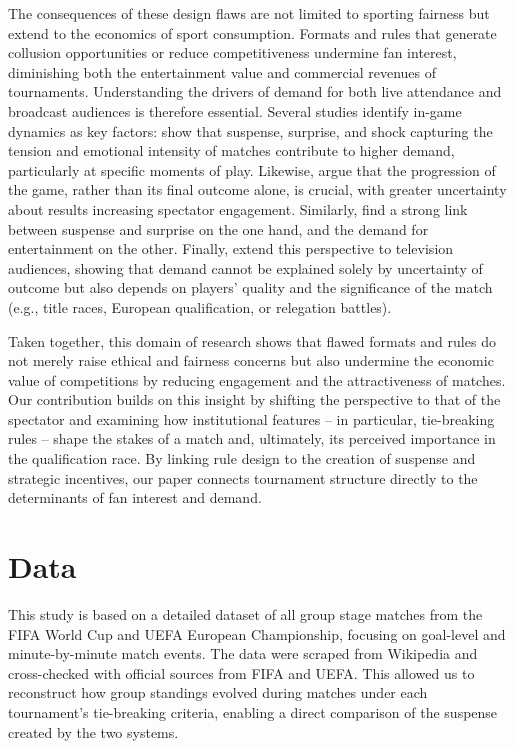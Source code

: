 \documentclass[11pt]{article}
\begin{document}
The consequences of these design flaws are not limited to sporting fairness but extend to the economics of sport consumption. Formats and rules that generate collusion opportunities or reduce competitiveness undermine fan interest, diminishing both the entertainment value and commercial revenues of tournaments. Understanding the drivers of demand for both live attendance and broadcast audiences is therefore essential. Several studies identify in-game dynamics as key factors: \citet{buraimo2020unscripted} show that suspense, surprise, and shock capturing the tension and emotional intensity of matches contribute to higher demand, particularly at specific moments of play. Likewise, \citet{alavy2010edge} argue that the progression of the game, rather than its final outcome alone, is crucial, with greater uncertainty about results increasing spectator engagement. Similarly, \citet{bizzozero2016importance} find a strong link between suspense and surprise on the one hand, and the demand for entertainment on the other. Finally, \citet{buraimo2022armchair} extend this perspective to television audiences, showing that demand cannot be explained solely by uncertainty of outcome but also depends on players' quality and the significance of the match (e.g., title races, European qualification, or relegation battles).

Taken together, this domain of research shows that flawed formats and rules do not merely raise ethical and fairness concerns but also undermine the economic value of competitions by reducing engagement and the attractiveness of matches. Our contribution builds on this insight by shifting the perspective to that of the spectator and examining how institutional features -- in particular, tie-breaking rules -- shape the stakes of a match and, ultimately, its perceived importance in the qualification race. By linking rule design to the creation of suspense and strategic incentives, our paper connects tournament structure directly to the determinants of fan interest and demand.


\section{Data}
\label{sec:data}


This study is based on a detailed dataset of all group stage matches from the FIFA World Cup and UEFA European Championship, focusing on goal-level and minute-by-minute match events. The data were scraped from Wikipedia and cross-checked with official sources from FIFA and UEFA. This allowed us to reconstruct how group standings evolved during matches under each tournament’s tie-breaking criteria, enabling a direct comparison of the suspense created by the two systems.
\end{document}
